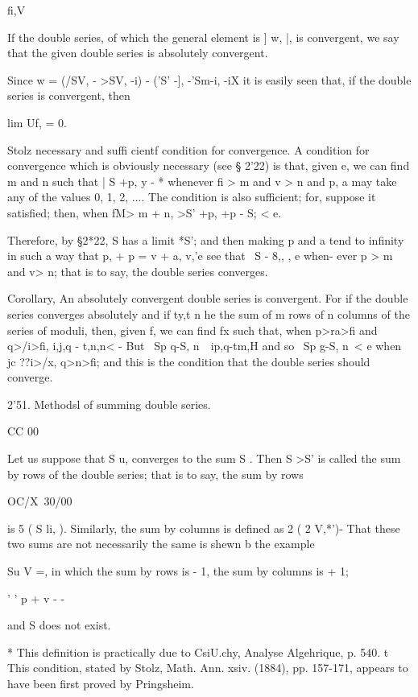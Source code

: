  fi,V



If the double series, of which the general element is ] w, |, is
convergent, we say that the given double series is absolutely
convergent.

Since w = (/SV, - >SV, -i) - ('S' -], -'Sm-i, -iX it is easily seen
that, if the double series is convergent, then

lim Uf, = 0.

Stolz necessary and suffi cientf condition for convergence. A
condition for convergence which is obviously necessary (see § 2'22) is
that, given e, we can find m and n such that | S +p, y - *%
whenever fi > m and v > n and p, a may take any of the values 0, 1, 2,
.... The condition is also sufficient; for, suppose it satisfied;
then, when fM> m + n, >S' +p, +p - S; < e.

Therefore, by §2*22, S has a limit *S'; and then making p and a tend
to infinity in such a way that p, + p = v + a, v,'e see that \ S - 8,,
, e when- ever p > m and v> n; that is to say, the double series
converges.

Corollary, An absolutely convergent double series is convergent. For
if the double series converges absolutely and if ty,t n he the sum of
m rows of n columns of the series of moduli, then, given f, we can
find fx such that, when p>ra>fi and q>/i>fi, i,j,q - t,n,n< - But \ Sp
q-S, n\ \ ip,q-tm,H and so \ Sp g-S, n\ < e when jc ??i>/x, q>n>fi;
and this is the condition that the double series should converge.

2'51. Methodsl of summing double series.

CC 00

Let us suppose that S u, converges to the sum S . Then S >S' is
called the sum by rows of the double series; that is to say, the sum
by rows

OC/X\ 30/00\

is 5 ( S li, ). Similarly, the sum by columns is defined as 2 ( 2
V,*')- That these two sums are not necessarily the same is shewn b the
example

Su V =, in which the sum by rows is - 1, the sum by columns is + 1;

' ' p + v - -

and S does not exist.

* This definition is practically due to CsiU.chy, Analyse Algehrique,
p. 540. t This condition, stated by Stolz, Math. Ann. xsiv. (1884),
pp. 157-171, appears to have been first proved by Pringsheim.

